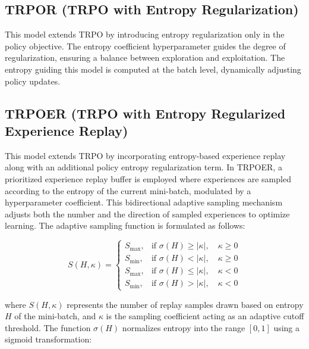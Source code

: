 \documentclass{article}
\begin{document}
\subsection{TRPOR (TRPO with Entropy Regularization)}

This model extends TRPO by introducing entropy regularization only in the policy objective. The entropy coefficient hyperparameter guides the degree of regularization, ensuring a balance between exploration and exploitation. The entropy guiding this model is computed at the batch level, dynamically adjusting policy updates.




\subsection{TRPOER (TRPO with Entropy Regularized Experience Replay)}

This model extends TRPO by incorporating entropy-based experience replay along with an additional policy entropy regularization term. In TRPOER, a prioritized experience replay buffer is employed where experiences are sampled according to the entropy of the current mini-batch, modulated by a hyperparameter coefficient. This bidirectional adaptive sampling mechanism adjusts both the number and the direction of sampled experiences to optimize learning. The adaptive sampling function is formulated as follows:

\begin{equation}
S(H, \kappa) =
\begin{cases}
S_{\max}, & \text{if } \sigma(H) \geq \lvert \kappa \rvert, \quad \kappa \geq 0 \\
S_{\min}, & \text{if } \sigma(H) < \lvert \kappa \rvert, \quad \kappa \geq 0 \\
S_{\max}, & \text{if } \sigma(H) \leq \lvert \kappa \rvert, \quad \kappa < 0 \\
S_{\min}, & \text{if } \sigma(H) > \lvert \kappa \rvert, \quad \kappa < 0
\end{cases}
\end{equation}

\noindent where \( S(H, \kappa) \) represents the number of replay samples drawn based on entropy \( H \) of the mini-batch, and \( \kappa \) is the sampling coefficient acting as an adaptive cutoff threshold. The function \( \sigma(H) \) normalizes entropy into the range \( [0,1] \) using a sigmoid transformation:
\end{document}
